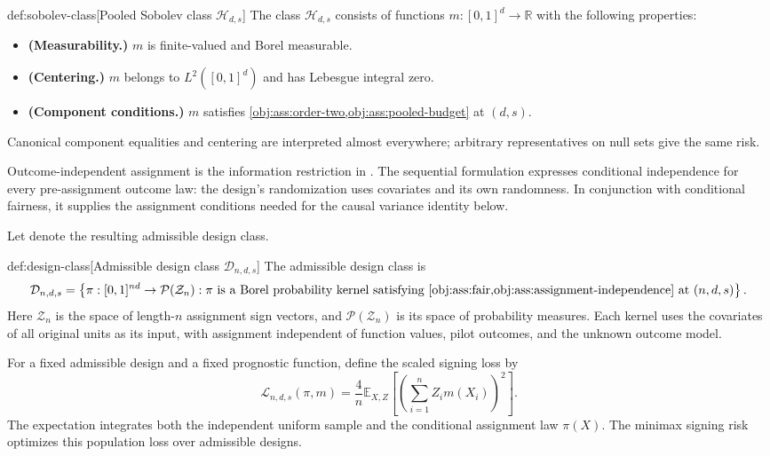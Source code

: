 \begin{definitionv}{def:sobolev-class}[Pooled Sobolev class \(\mathcal H_{d,s}\)]
The class \(\mathcal H_{d,s}\) consists of functions \(m:[0,1]^d\to\mathbb R\) with the following properties:
\begin{itemize}
\item \textbf{(Measurability.)} \(m\) is finite-valued and Borel measurable.
\item \textbf{(Centering.)} \(m\) belongs to \(L^2([0,1]^d)\) and has Lebesgue integral zero.
\item \textbf{(Component conditions.)} \(m\) satisfies \cref{obj:ass:order-two,obj:ass:pooled-budget} at \((d,s)\).
\end{itemize}
Canonical component equalities and centering are interpreted almost everywhere; arbitrary representatives on null sets give the same risk.
\end{definitionv}

Outcome-independent assignment is the information restriction in \citep[Definition 2.2]{Cytrynbaum2026Limits}. The sequential formulation expresses conditional independence for every pre-assignment outcome law: the design's randomization uses covariates and its own randomness. In conjunction with conditional fairness, it supplies the assignment conditions needed for the causal variance identity below.

Let  denote the resulting admissible design class.

\begin{definitionv}{def:design-class}[Admissible design class $\mathcal D_{n,d,s}$]
The admissible design class is
\[
\mathcal D_{n,d,s}
=
\left\{
\pi:[0,1]^{nd}\to\mathcal P(\mathcal Z_n):
\pi \text{ is a Borel probability kernel satisfying }
\cref{obj:ass:fair,obj:ass:assignment-independence}
\text{ at }(n,d,s)
\right\}.
\]
Here \(\mathcal Z_n\) is the space of length-\(n\) assignment sign vectors, and \(\mathcal P(\mathcal Z_n)\) is its space of probability measures. Each kernel uses the covariates of all original units as its input, with assignment independent of function values, pilot outcomes, and the unknown outcome model.
\end{definitionv}

For a fixed admissible design and a fixed prognostic function, define the scaled signing loss  by
\[
\mathcal L_{n,d,s}(\pi,m)
=
\frac4n
\mathbb E_{X,Z}
\left[
\left(\sum_{i=1}^n Z_i m(X_i)\right)^2
\right].
\]
The expectation integrates both the independent uniform sample and the conditional assignment law \(\pi(X)\). The minimax signing risk  optimizes this population loss over admissible designs.

